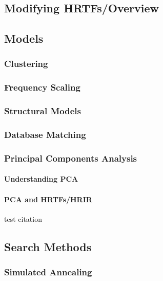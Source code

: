 \subsection{Modifying HRTFs/Overview}


\subsection{Models}

\subsubsection{Clustering}

\subsubsection{Frequency Scaling}

\subsubsection{Structural Models}

\subsubsection{Database Matching}

\subsubsection{Principal Components Analysis}

\paragraph{Understanding PCA}

\paragraph{PCA and HRTFs/HRIR}
test citation \citep{Holzl2012a} 
\subsection{Search Methods}

\subsubsection{Simulated Annealing}